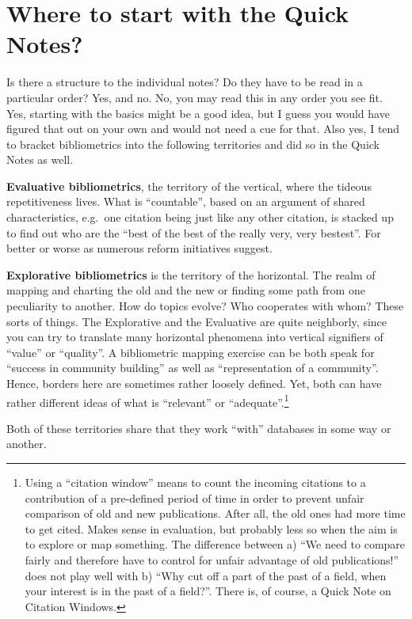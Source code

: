 \documentclass[
  letterpaper,
]{scrreprt}
\begin{document}
\section{Where to start with the Quick
Notes?}\label{where-to-start-with-the-quick-notes}

Is there a structure to the individual notes? Do they have to be read in
a particular order? Yes, and no. No, you may read this in any order you
see fit. Yes, starting with the basics might be a good idea, but I guess
you would have figured that out on your own and would not need a cue for
that. Also yes, I tend to bracket bibliometrics into the following
territories and did so in the Quick Notes as well.

\textbf{Evaluative bibliometrics}, the territory of the vertical, where
the tideous repetitiveness lives. What is ``countable'', based on an
argument of shared characteristics, e.g.~one citation being just like
any other citation, is stacked up to find out who are the ``best of the
best of the really very, very bestest''. For better or worse as numerous
reform initiatives suggest.

\textbf{Explorative bibliometrics} is the territory of the horizontal.
The realm of mapping and charting the old and the new or finding some
path from one peculiarity to another. How do topics evolve? Who
cooperates with whom? These sorts of things. The Explorative and the
Evaluative are quite neighborly, since you can try to translate many
horizontal phenomena into vertical signifiers of ``value'' or
``quality''. A bibliometric mapping exercise can be both speak for
``success in community building'' as well as ``representation of a
community''. Hence, borders here are sometimes rather loosely defined.
Yet, both can have rather different ideas of what is ``relevant'' or
``adequate''.\footnote{Using a ``citation window'' means to count the
  incoming citations to a contribution of a pre-defined period of time
  in order to prevent unfair comparison of old and new publications.
  After all, the old ones had more time to get cited. Makes sense in
  evaluation, but probably less so when the aim is to explore or map
  something. The difference between a) ``We need to compare fairly and
  therefore have to control for unfair advantage of old publications!''
  does not play well with b) ``Why cut off a part of the past of a
  field, when your interest is in the past of a field?''. There is, of
  course, a Quick Note on Citation Windows.}

Both of these territories share that they work ``with'' databases in
some way or another.
\end{document}
